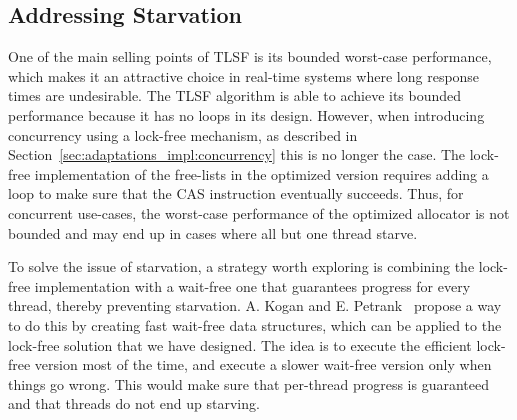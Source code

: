 
\subsection{Addressing Starvation}
\label{sec:future-work:starvation}

One of the main selling points of TLSF is its bounded worst-case performance, which makes it an attractive choice in real-time systems where long response times are undesirable. The TLSF algorithm is able to achieve its bounded performance because it has no loops in its design. However, when introducing concurrency using a lock-free mechanism, as described in Section~\ref{sec:adaptations_impl:concurrency} this is no longer the case. The lock-free implementation of the free-lists in the optimized version requires adding a loop to make sure that the CAS instruction eventually succeeds. Thus, for concurrent use-cases, the worst-case performance of the optimized allocator is not bounded and may end up in cases where all but one thread starve. 

To solve the issue of starvation, a strategy worth exploring is combining the lock-free implementation with a wait-free one that guarantees progress for every thread, thereby preventing starvation. A. Kogan and E. Petrank~\cite{fast_wait_free} propose a way to do this by creating fast wait-free data structures, which can be applied to the lock-free solution that we have designed. The idea is to execute the efficient lock-free version most of the time, and execute a slower wait-free version only when things go wrong. This would make sure that per-thread progress is guaranteed and that threads do not end up starving.

